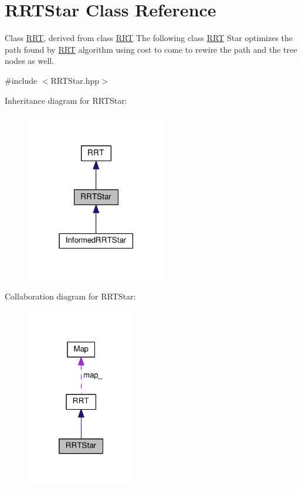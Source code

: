 \hypertarget{classRRTStar}{}\section{R\+R\+T\+Star Class Reference}
\label{classRRTStar}


Class \hyperlink{classRRT}{R\+RT}, derived from class \hyperlink{classRRT}{R\+RT} The following class \hyperlink{classRRT}{R\+RT} Star optimizes the path found by \hyperlink{classRRT}{R\+RT} algorithm using cost to come to rewire the path and the tree nodes as well.  




{\ttfamily \#include $<$R\+R\+T\+Star.\+hpp$>$}



Inheritance diagram for R\+R\+T\+Star\+:
\nopagebreak
\begin{figure}[H]
\begin{center}
\leavevmode
\includegraphics[width=174pt]{classRRTStar__inherit__graph}
\end{center}
\end{figure}


Collaboration diagram for R\+R\+T\+Star\+:
\nopagebreak
\begin{figure}[H]
\begin{center}
\leavevmode
\includegraphics[width=136pt]{classRRTStar__coll__graph}
\end{center}
\end{figure}
